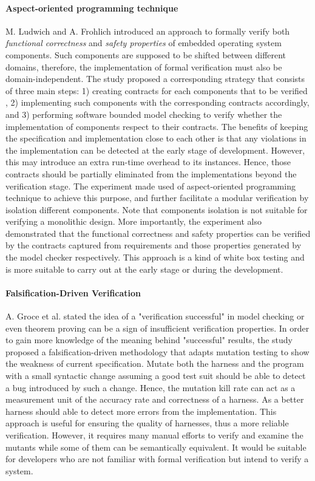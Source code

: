 \paragraph{Aspect-oriented programming technique} M. Ludwich and A. Frohlich \cite{Ludwich:2013:FVC:2433140.2433148} introduced an approach to formally verify both \textit{functional correctness} and \textit{safety properties} of embedded operating system components. Such components are supposed to be shifted between different domains, therefore, the implementation of formal verification must also be domain-independent. The study proposed a corresponding strategy that consists of three main steps: 1) creating contracts for each components that to be verified , 2) implementing such components with the corresponding contracts accordingly, and 3) performing software bounded model checking to verify whether the implementation of components respect to their contracts. The benefits of keeping the specification and implementation close to each other is that any violations in the implementation can be detected at the early stage of development. However, this may introduce an extra run-time overhead to its instances. Hence, those contracts should be partially eliminated from the implementations beyond the verification stage. The experiment made used of aspect-oriented programming technique to achieve this purpose, and further facilitate a modular verification by isolation different components. Note that components isolation is not suitable for verifying a monolithic design. More importantly, the experiment also demonstrated that the functional correctness and safety properties can be verified by the contracts captured from requirements and those properties generated by the model checker respectively. This approach is a kind of white box testing and is more suitable to carry out at the early stage or during the development.

\paragraph{Falsification-Driven Verification} A. Groce et al. \cite{7372062} stated the idea of a "verification successful" in model checking or even theorem proving can be a sign of insufficient verification properties. In order to gain more knowledge of the meaning behind "successful" results, the study proposed a falsification-driven methodology that adapts mutation testing to show the weakness of current specification. Mutate both the harness and the program with a small syntactic change assuming a good test suit should be able to detect a bug introduced by such a change. Hence, the mutation kill rate can act as a measurement unit of the accuracy rate and correctness of a harness. As a better harness should able to detect more errors from the implementation. This approach is useful for ensuring the quality of harnesses, thus a more reliable verification. However, it requires many manual efforts to verify and examine the mutants while some of them can be semantically equivalent. It would be suitable for developers who are not familiar with formal verification but intend to verify a system.

